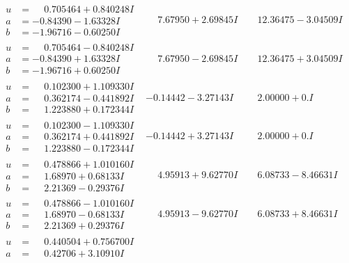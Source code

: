 \documentclass[1p]{elsarticle_modified}
\theoremstyle{definition}
\begin{document}
$$\begin{array}{c|c|c}
\begin{aligned}
u &= \phantom{-}0.705464 + 0.840248 I \\
a &= -0.84390 - 1.63328 I \\
b &= -1.96716 - 0.60250 I\end{aligned}
 & \phantom{-}7.67950 + 2.69845 I & \phantom{-}12.36475 - 3.04509 I \\ \hline\begin{aligned}
u &= \phantom{-}0.705464 - 0.840248 I \\
a &= -0.84390 + 1.63328 I \\
b &= -1.96716 + 0.60250 I\end{aligned}
 & \phantom{-}7.67950 - 2.69845 I & \phantom{-}12.36475 + 3.04509 I \\ \hline\begin{aligned}
u &= \phantom{-}0.102300 + 1.109330 I \\
a &= \phantom{-}0.362174 - 0.441892 I \\
b &= \phantom{-}1.223880 + 0.172344 I\end{aligned}
 & -0.14442 - 3.27143 I & \phantom{-}2.00000 + 0. I\phantom{ +0.000000I} \\ \hline\begin{aligned}
u &= \phantom{-}0.102300 - 1.109330 I \\
a &= \phantom{-}0.362174 + 0.441892 I \\
b &= \phantom{-}1.223880 - 0.172344 I\end{aligned}
 & -0.14442 + 3.27143 I & \phantom{-}2.00000 + 0. I\phantom{ +0.000000I} \\ \hline\begin{aligned}
u &= \phantom{-}0.478866 + 1.010160 I \\
a &= \phantom{-}1.68970 + 0.68133 I \\
b &= \phantom{-}2.21369 - 0.29376 I\end{aligned}
 & \phantom{-}4.95913 + 9.62770 I & \phantom{-}6.08733 - 8.46631 I \\ \hline\begin{aligned}
u &= \phantom{-}0.478866 - 1.010160 I \\
a &= \phantom{-}1.68970 - 0.68133 I \\
b &= \phantom{-}2.21369 + 0.29376 I\end{aligned}
 & \phantom{-}4.95913 - 9.62770 I & \phantom{-}6.08733 + 8.46631 I \\ \hline\begin{aligned}
u &= \phantom{-}0.440504 + 0.756700 I \\
a &= \phantom{-}0.42706 + 3.10910 I \\

\end{aligned}
\end{array}$$
\end{document}
